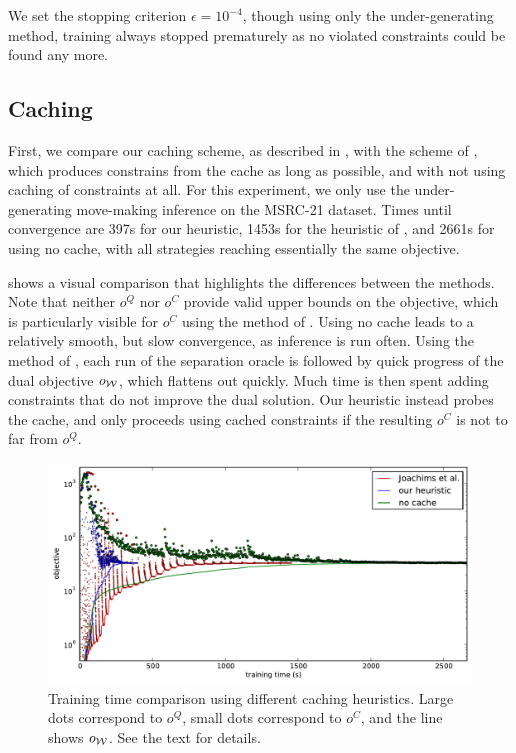 We set the stopping criterion $\epsilon=10^{-4}$, though using only
the under-generating method, training always stopped prematurely as no violated
constraints could be found any more.

\subsection{Caching}
First, we compare our caching scheme, as described in , with the
scheme of \citet{joachims2009cutting}, which produces constrains from the cache
as long as possible, and with not using caching of constraints at all.  For this experiment,
we only use the under-generating move-making inference on the MSRC-21 dataset. Times until convergence
are 397s for our heuristic, 1453s for the heuristic of
\citet{joachims2009cutting}, and 2661s for using no cache, with all strategies
reaching essentially the same objective.

 shows a visual comparison that highlights the differences
between the methods. Note that neither $o^Q$ nor $o^C$ provide valid upper bounds on the objective,
which is particularly visible for $o^C$ using the method of \cite{joachims2009cutting}.
Using no cache leads to a relatively smooth, but slow convergence, as inference is run often.
Using the method of \citet{joachims2009cutting}, each run of the separation oracle is followed by
quick progress of the dual objective $o_{\mathcal{W}}$, which flattens out quickly. Much time is then spent adding
constraints that do not improve the dual solution.
Our heuristic instead probes the cache, and only proceeds using cached constraints if the resulting
$o^C$ is not to far from $o^Q$.

\begin{figure}
\centering
\includegraphics[width=\linewidth]{caching}
\caption{%
Training time comparison using different caching heuristics.
Large dots correspond to $o^Q$, small dots correspond to $o^C$,
and the line shows $o_{\mathcal{W}}$. See the text for details.}
\end{figure}



